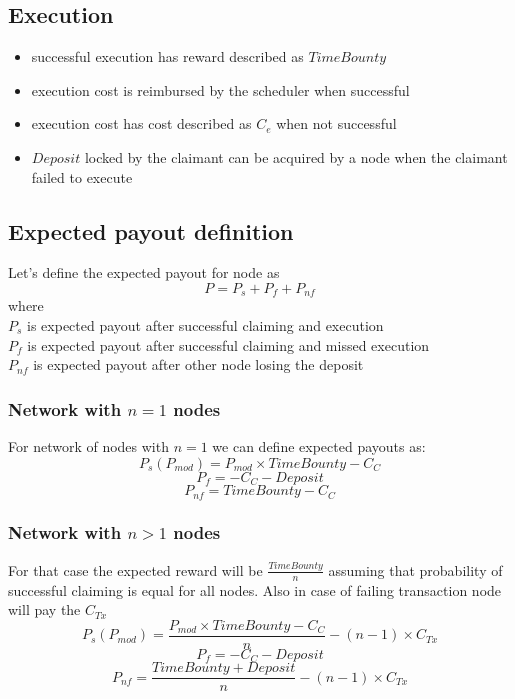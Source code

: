 \documentclass{report}
\begin{document}
\begin{appendices}
  \subsection{Execution}
  \begin{itemize}
  \item successful execution has reward described as $TimeBounty$ 
  \item execution cost is reimbursed by the scheduler when successful
  \item execution cost has cost described as $C_{e}$ when not successful
  \item $Deposit$ locked by the claimant can be acquired by a node when the claimant failed to execute
  \end{itemize}
  
  \subsection{Expected payout definition}
  Let's define the expected payout for node as
  \[
  P=P_{s}+P_{f}+P_{nf}
  \]
  where
  \\
  
  $P_{s}$ is expected payout after successful claiming and execution
  \\
  
  $P_{f}$ is expected payout after successful claiming and missed execution
  \\
  
  $P_{nf}$ is expected payout after other node losing the deposit
  \\
  
  \subsubsection{Network with $n=1$ nodes}
  For network of nodes with $n=1$ we can define expected payouts as:
  \[
  P_{s}(P_{mod})=P_{mod} \times TimeBounty-C_{C} 
  \]
  \[
  P_{f}=-C_{C}-Deposit
  \]
  \[
  P_{nf}=TimeBounty-C_{C}
  \]
  \subsubsection{Network with $n>1$ nodes}
  For that case the expected reward will be $\frac{TimeBounty}{n}$ assuming that probability of successful claiming is equal for all nodes. Also in case of failing transaction node will pay the $C_{Tx}$
  \[
  P_{s}(P_{mod})=\frac{P_{mod} \times TimeBounty-C_{C}}{n} - (n-1) \times C_{Tx}
  \]
  \[
  P_{f}=-C_{C}-Deposit
  \]
  \[
  P_{nf}=\frac{TimeBounty+Deposit}{n} - (n-1) \times C_{Tx}
  \]
  

\end{appendices}
\end{document}
